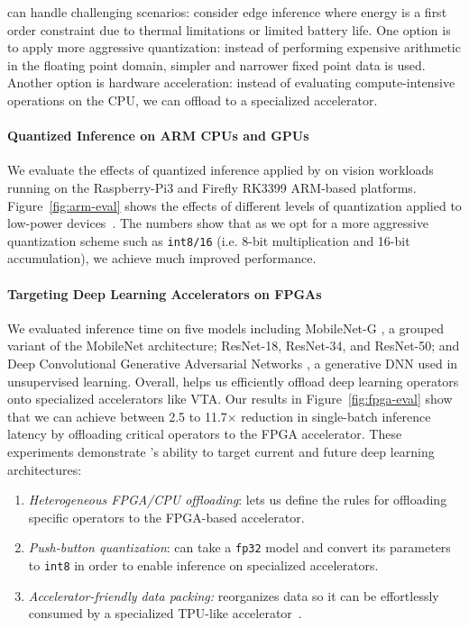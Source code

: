   \relay can handle challenging scenarios: consider edge inference where energy is a first order
    constraint due to thermal limitations or limited battery life.
  One option is to apply more aggressive quantization: instead of performing expensive
    arithmetic in the floating point domain, simpler and narrower fixed point data is used.
  Another option is hardware acceleration: instead of evaluating
    compute-intensive operations on the CPU, we can offload to a specialized accelerator.

  \paragraph{Quantized Inference on ARM CPUs and GPUs}
  We evaluate the effects of quantized inference applied by \relay on vision workloads running
  on the Raspberry-Pi3 and Firefly RK3399 ARM-based platforms.
  Figure~\ref{fig:arm-eval} shows the effects of different levels
    of quantization applied to low-power devices~\citep{relay_arixv}.
  The numbers show that as we opt for a more aggressive quantization scheme such as \texttt{int8/16} (i.e. 8-bit multiplication and 16-bit accumulation), we achieve much improved performance.

  \paragraph{Targeting Deep Learning Accelerators on FPGAs}
  We evaluated inference time on five models including MobileNet-G \citep{mobilenet}, a grouped variant of the MobileNet architecture; ResNet-18, ResNet-34, and ResNet-50\citep{resnet}; and Deep Convolutional Generative Adversarial Networks \citep{dcgan}, a generative DNN used in unsupervised learning.
  Overall, \relay helps us efficiently offload deep learning operators onto specialized accelerators like VTA.
  Our results in Figure~\ref{fig:fpga-eval} show that we can achieve between 2.5 to 11.7$\times$ reduction in single-batch inference latency by offloading critical operators to the FPGA accelerator.
  These experiments demonstrate \relay's ability to target current and future deep learning architectures:
  \begin{enumerate}
    \item \textit{Heterogeneous FPGA/CPU offloading}: \relay lets us define the rules for offloading specific operators to the FPGA-based accelerator.
    \item \textit{Push-button quantization}: \relay can take a \texttt{fp32} model and convert its parameters to \texttt{int8} in order to enable inference on specialized accelerators.
    \item \textit{Accelerator-friendly data packing:} \relay reorganizes data so it can be effortlessly consumed by a specialized TPU-like accelerator~\citep{tpuv1}.
  \end{enumerate}

